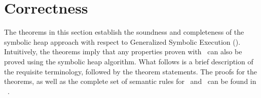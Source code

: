 \section{Correctness}
\label{sec:bisim}

The theorems in this section establish the soundness and
completeness of the symbolic heap approach with respect to Generalized
Symbolic Execution (\gsetxt{}). Intuitively, the theorems imply that any properties proven
with~\gsetxt{} can also be proved using the symbolic heap
algorithm. What follows is a brief description of the requisite terminology,
followed by the theorem statements. The proofs for the theorems, as well as
the complete set of semantic rules for~\gsetxt{} and~\symtxt{} can
be found in ~\cite{Hillery:2015}. 

